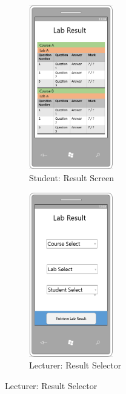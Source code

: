 \documentclass[11pt]{report}
\begin{document}
\begin{figure}[H]
\caption{Results Page: Mobile Designs}
\label{fig:result-mb}
\centering
\begin{subfigure}[c]{0.3\textwidth}
    \centering
    \includegraphics[width=0.4\textwidth]{images/design/result-student-mobile.png}
    \caption{Student: Result Screen}
    \label{fig:design-result-student-mb}
\end{subfigure}
\hfill
\begin{subfigure}[c]{0.3\textwidth}
    \centering
    \includegraphics[width=0.4\textwidth]{images/design/result-select-mobile.png}
    \caption{Lecturer: Result Selector}

\end{subfigure}
\end{figure}
\end{document}
